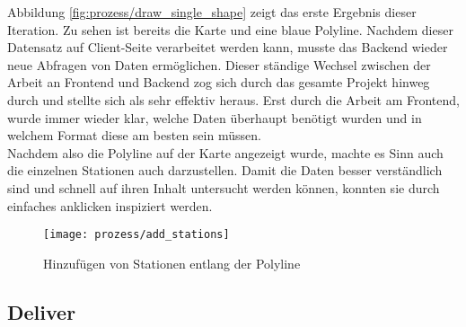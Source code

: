 \begin{newpage}
      Abbildung \ref{fig:prozess/draw_single_shape} zeigt das erste Ergebnis dieser Iteration. Zu sehen ist bereits die Karte und eine blaue Polyline. Nachdem dieser Datensatz auf Client-Seite verarbeitet werden kann, musste das Backend wieder neue Abfragen von Daten ermöglichen. Dieser ständige Wechsel zwischen der Arbeit an Frontend und Backend zog sich durch das gesamte Projekt hinweg durch und stellte sich als sehr effektiv heraus. Erst durch die Arbeit am Frontend, wurde immer wieder klar, welche Daten überhaupt benötigt wurden und in welchem Format diese am besten sein müssen.\\

      Nachdem also die Polyline auf der Karte angezeigt wurde, machte es Sinn auch die einzelnen Stationen auch darzustellen. Damit die Daten besser verständlich sind und schnell auf ihren Inhalt untersucht werden können, konnten sie durch einfaches anklicken inspiziert werden.

      \begin{figure}[htbp]
        \begin{center}
          \texttt{[image: prozess/add\_stations]}
          \caption{Hinzufügen von Stationen entlang der Polyline}
          \label{fig:prozess/add_stations}
        \end{center}
      \end{figure}
          
      
      

    \subsection{Deliver}
    \label{sub:deliver}
      

    
\end{newpage}